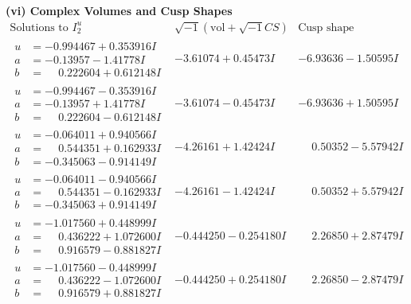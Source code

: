 \documentclass[1p]{elsarticle_modified}
\theoremstyle{definition}
\newcommand{\I}{\sqrt{-1}}
\begin{document}
\newpage\flushleft \textbf{(vi) Complex Volumes and Cusp Shapes}
$$\begin{array}{c|c|c}  
\text{Solutions to }I^u_{2}& \I (\text{vol} + \sqrt{-1}CS) & \text{Cusp shape}\\
 \hline 
\begin{aligned}
u &= -0.994467 + 0.353916 I \\
a &= -0.13957 - 1.41778 I \\
b &= \phantom{-}0.222604 + 0.612148 I\end{aligned}
 & -3.61074 + 0.45473 I & -6.93636 - 1.50595 I \\ \hline\begin{aligned}
u &= -0.994467 - 0.353916 I \\
a &= -0.13957 + 1.41778 I \\
b &= \phantom{-}0.222604 - 0.612148 I\end{aligned}
 & -3.61074 - 0.45473 I & -6.93636 + 1.50595 I \\ \hline\begin{aligned}
u &= -0.064011 + 0.940566 I \\
a &= \phantom{-}0.544351 + 0.162933 I \\
b &= -0.345063 - 0.914149 I\end{aligned}
 & -4.26161 + 1.42424 I & \phantom{-}0.50352 - 5.57942 I \\ \hline\begin{aligned}
u &= -0.064011 - 0.940566 I \\
a &= \phantom{-}0.544351 - 0.162933 I \\
b &= -0.345063 + 0.914149 I\end{aligned}
 & -4.26161 - 1.42424 I & \phantom{-}0.50352 + 5.57942 I \\ \hline\begin{aligned}
u &= -1.017560 + 0.448999 I \\
a &= \phantom{-}0.436222 + 1.072600 I \\
b &= \phantom{-}0.916579 - 0.881827 I\end{aligned}
 & -0.444250 - 0.254180 I & \phantom{-}2.26850 + 2.87479 I \\ \hline\begin{aligned}
u &= -1.017560 - 0.448999 I \\
a &= \phantom{-}0.436222 - 1.072600 I \\
b &= \phantom{-}0.916579 + 0.881827 I\end{aligned}
 & -0.444250 + 0.254180 I & \phantom{-}2.26850 - 2.87479 I \\ \hline\begin{aligned}

\end{aligned}
\end{array}$$
\end{document}
